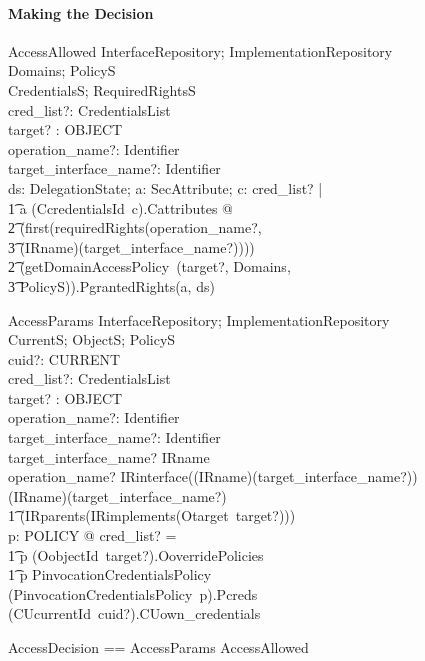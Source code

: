 \paragraph{Making the Decision}
\begin{schema}{AccessAllowed}
  InterfaceRepository; ImplementationRepository \\
  Domains; PolicyS \\
  CredentialsS; RequiredRightsS \\

  cred\_list?: CredentialsList \\
  target? : OBJECT \\
  operation\_name?: Identifier \\
  target\_interface\_name?: Identifier \\
  \where
  \exists ds: DelegationState; a: SecAttribute; c: \ran cred\_list? | \\
  \t1 a \in (CcredentialsId~c).Cattributes @ \\
  \t2 \ran (first(requiredRights(operation\_name?, \\
  \t3 (IRname\inv)(target\_interface\_name?)))) \subseteq \\
  \t2 (getDomainAccessPolicy~(target?, \theta Domains, \\
  \t3 \theta PolicyS)).PgrantedRights(a, ds) \\
\end{schema}
\begin{schema}{AccessParams}
  InterfaceRepository; ImplementationRepository \\
  CurrentS; ObjectS; PolicyS \\

  cuid?: CURRENT \\

  cred\_list?: CredentialsList \\
  target? : OBJECT \\
  operation\_name?: Identifier \\
  target\_interface\_name?: Identifier \\
  \where
  target\_interface\_name? \in \ran IRname \\
  operation\_name? \in IRinterface((IRname\inv)(target\_interface\_name?)) \\
  (IRname\inv)(target\_interface\_name?) \in \\
  \t1 \ran (IRparents(IRimplements(Otarget~target?))) \\

  \exists p: POLICY @ cred\_list? = \\
  \t1 \< \IF p \in (OobjectId~target?).OoverridePolicies \land \\
  \t1 p \in \dom PinvocationCredentialsPolicy \\
  \THEN (PinvocationCredentialsPolicy~p).Pcreds \\
  \ELSE (CUcurrentId~cuid?).CUown\_credentials \>
\end{schema}
\begin{zed}
  AccessDecision == AccessParams \land AccessAllowed \\
\end{zed}


